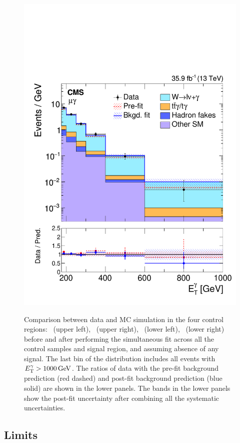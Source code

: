 \begin{figure}[htbp]
{    \includegraphics[]{Analysis/Figures/results/bonly_monomu.pdf}
  }
    \caption{
      Comparison between data and MC simulation in the four control regions: 
      \Pe\Pe\Pgg\ (upper left), 
      \Pgm\Pgm\Pgg\ (upper right), 
      \Pe\Pgg\ (lower left), 
      \Pgm\Pgg\ (lower right) 
      before and after performing the simultaneous fit across all the control samples and signal region, and assuming absence of any signal.
      The last bin of the distribution includes all events with $E_{\mathrm{T}}^{\gamma} > 1000\,\text{Ge\hspace{-.08em}V}$. 
      The ratios of data with the pre-fit background prediction (red dashed) and post-fit background prediction (blue solid) are shown in the lower panels. 
      The bands in the lower panels show the post-fit uncertainty after combining all the systematic uncertainties.
}
    \label{fig:postfitCR}
\end{figure}

\subsection{Limits}
\label{sec:limits}


